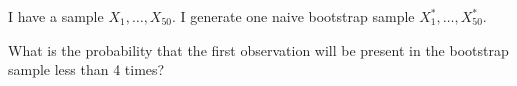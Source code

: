 
\begin{question}
I have a sample \(X_1, \ldots, X_{50}\).
I generate one naive bootstrap sample \(X^*_1, \ldots, X^*_{50}\).

What is the probability that the first observation will be present in the bootstrap sample less than 4 times?


\end{question}


